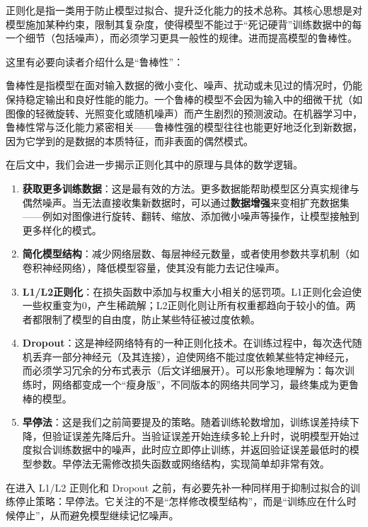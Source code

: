 \documentclass[lang=cn,zihao=-4,a4paper,fontset=windows]{beautybook}
\begin{document}
\begin{definition}
正则化是指一类用于防止模型过拟合、提升泛化能力的技术总称。其核心思想是对模型施加某种约束，限制其复杂度，使得模型不能过于“死记硬背”训练数据中的每一个细节（包括噪声），而必须学习更具一般性的规律。进而提高模型的鲁棒性。
\end{definition}
这里有必要向读者介绍什么是“鲁棒性”：
\begin{definition}
鲁棒性是指模型在面对输入数据的微小变化、噪声、扰动或未见过的情况时，仍能保持稳定输出和良好性能的能力。一个鲁棒的模型不会因为输入中的细微干扰（如图像的轻微旋转、光照变化或随机噪声）而产生剧烈的预测波动。在机器学习中，鲁棒性常与泛化能力紧密相关——鲁棒性强的模型往往也能更好地泛化到新数据，因为它学到的是数据的本质特征，而非表面的偶然模式。
\end{definition}
在后文中，我们会进一步揭示正则化其中的原理与具体的数学逻辑。
\begin{enumerate}
\item \textbf{获取更多训练数据}：这是最有效的方法。更多数据能帮助模型区分真实规律与偶然噪声。当无法直接收集新数据时，可以通过\textbf{数据增强}来变相扩充数据集——例如对图像进行旋转、翻转、缩放、添加微小噪声等操作，让模型接触到更多样化的模式。
\item \textbf{简化模型结构}：减少网络层数、每层神经元数量，或者使用参数共享机制（如卷积神经网络），降低模型容量，使其没有能力去记住噪声。
\item \textbf{L1/L2正则化}：在损失函数中添加与权重大小相关的惩罚项。L1正则化会迫使一些权重变为0，产生稀疏解；L2正则化则让所有权重都趋向于较小的值。两者都限制了模型的自由度，防止某些特征被过度依赖。
\item \textbf{Dropout}：这是神经网络特有的一种正则化技术。在训练过程中，每次迭代随机丢弃一部分神经元（及其连接），迫使网络不能过度依赖某些特定神经元，而必须学习冗余的分布式表示（后文详细展开）。可以形象地理解为：每次训练时，网络都变成一个“瘦身版”，不同版本的网络共同学习，最终集成为更鲁棒的模型。
\item \textbf{早停法}：这是我们之前简要提及的策略。随着训练轮数增加，训练误差持续下降，但验证误差先降后升。当验证误差开始连续多轮上升时，说明模型开始过度拟合训练数据中的噪声，此时应立即停止训练，并返回验证误差最低时的模型参数。早停法无需修改损失函数或网络结构，实现简单却非常有效。
\end{enumerate}

在进入 L1/L2 正则化和 Dropout 之前，有必要先补一种同样用于抑制过拟合的训练停止策略：早停法。它关注的不是“怎样修改模型结构”，而是“训练应在什么时候停止”，从而避免模型继续记忆噪声。
\end{document}
